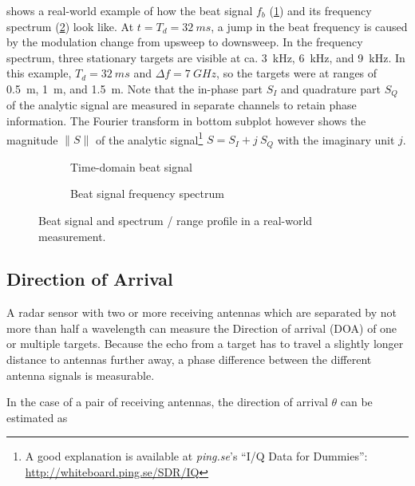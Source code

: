  shows a real-world example of how the beat signal \(f_b\)
(\cref{fig:rawbeat_t}) and its frequency spectrum (\cref{fig:rawbeat_f}) look like. At
\(t=T_d=\SI{32}{ms}\), a jump in the beat frequency is caused by the modulation
change from upsweep to downsweep. In the frequency spectrum, three
stationary targets are visible at ca. \SI{3}{kHz}, \SI{6}{kHz}, and \SI{9}{kHz}.
In this example, \(T_d=\SI{32}{ms}\) and \(\Delta f=\SI{7}{GHz}\), so the targets were
at ranges of \SI{0.5}{m}, \SI{1}{m}, and \SI{1.5}{m}. Note that the in-phase part
\(S_I\) and quadrature part \(S_Q\) of the analytic signal are measured
in separate channels to retain phase information. The Fourier transform
in bottom subplot however shows the magnitude \(\|S\|\) of the analytic
signal\footnote{A good explanation is available at \textit{ping.se}'s ``I/Q Data for Dummies'': \url{http://whiteboard.ping.se/SDR/IQ}}
\(S = S_I + j~S_Q\) with the imaginary unit \(j\).

\begin{figure}[htp]
    \centering
    \begin{subfigure}{0.475\textwidth}
      \def\svgwidth{\linewidth} \small
      
      \caption{\label{fig:rawbeat_t}Time-domain beat signal}
    \end{subfigure}
    \hfill
    \begin{subfigure}{0.475\textwidth}
      \def\svgwidth{\linewidth} \small
      
      \caption{\label{fig:rawbeat_f}Beat signal frequency spectrum}
    \end{subfigure}
    \caption{\label{fig:fig_raw_beat}Beat signal and spectrum / range profile in a real-world measurement.}
\end{figure}

\subsection{Direction of Arrival}\label{direction-of-arrival}

A radar sensor with two or more receiving antennas which are separated
by not more than half a wavelength can measure the Direction of arrival
(DOA) of one or multiple targets. Because the echo from a target has to
travel a slightly longer distance to antennas further away, a phase
difference between the different antenna signals is measurable.

In the case of a pair of receiving antennas, the direction of arrival
\(\theta\) can be estimated \cite{VanZeijl2014} as


